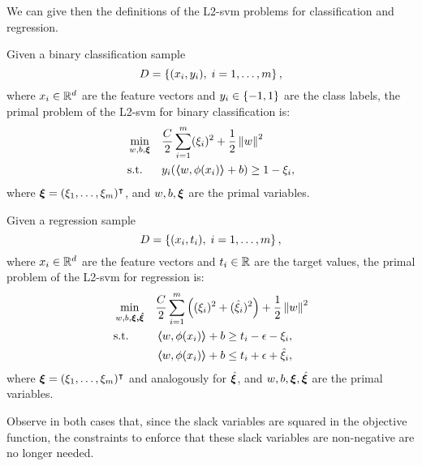 We can give then the definitions of the L2-\acrshort{svm} problems for classification and regression.
\begin{definition}
    Given a binary classification sample
    $$ D = \left\{(x_i, y_i), \; i=1, \ldots, m\right\} ,$$
    where $x_i \in \mathbb{R}^d$ are the feature vectors and $y_i \in \left\{-1, 1\right\}$ are the class labels, 
    the primal problem of the L2-\acrshort{svm} for binary classification is:
    \begin{equation}
        \label{eq:l2_primal_clas}
        \begin{aligned}
            &\min_{w, b, \fv{\xi}} & & \frac{C}{2} \sum_{i=1}^m (\xi_i)^2 + \frac{1}{2} \norm{w}^2 \\
            & \text{s.t.} & & y_i (\dotp{w}{\phi(x_i)} + b) \geq 1 - \xi_i , 
        \end{aligned}  
    \end{equation}
    where $\bm{\xi} = (\xi_1, \ldots, \xi_m)^\intercal$, and $w, b, \bm{\xi}$ are the primal variables.
\end{definition}
%
\begin{definition}
    Given a regression sample
    $$ D = \left\{(x_i, t_i), \; i=1, \ldots, m\right\} ,$$
    where $x_i \in \mathbb{R}^d$ are the feature vectors and $t_i \in \mathbb{R}$ are the target values, 
    the primal problem of the L2-\acrshort{svm} for regression is:
    \begin{equation}
        \label{eq:l2_primal_reg}
        \begin{aligned}
            &\min_{w, b, \fv{\xi, \hat{\fv{\xi}}}} & & \frac{C}{2} \sum_{i=1}^m \left((\xi_i)^2 + (\hat{\xi}_i)^2 \right) + \frac{1}{2} \norm{w}^2 \\
            & \text{s.t.} & & \dotp{w}{\phi(x_i)} + b \geq t_i - \epsilon - \xi_i  , \\
            & & & \dotp{w}{\phi(x_i)} + b \leq t_i + \epsilon + \hat{\xi}_i , 
        \end{aligned}  
    \end{equation}
    where $\bm{\xi} = (\xi_1, \ldots, \xi_m)^\intercal$ and analogously for $\hat{\bm{\xi}}$, and $w, b, \bm{\xi}, \hat{\bm{\xi}}$ are the primal variables.
\end{definition}
%
Observe in both cases that, since the slack variables are squared in the objective function, the constraints to enforce that these slack variables are non-negative are no longer needed.
